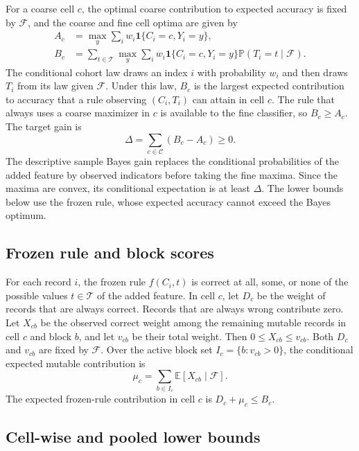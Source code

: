 \documentclass[preprint,11pt]{elsarticle}
\newcommand{\E}{\mathbb E}
\newcommand{\Prb}{\mathbb P}
\newcommand{\given}{\mathcal F}
\begin{document}
For a coarse cell $c$, the optimal coarse contribution to expected accuracy is fixed by $\given$, and the coarse and fine cell optima are given by
\begin{align}
 A_c &= \max_y \sum_i w_i\mathbf 1\{C_i=c,Y_i=y\},\\
 B_c &= \sum_{t\in\mathcal T}\max_y
 \sum_i w_i\mathbf 1\{C_i=c,Y_i=y\}\Prb(T_i=t\mid\given).
\end{align}
The conditional cohort law draws an index $i$ with probability $w_i$ and then draws $T_i$ from its law given $\given$. Under this law, $B_c$ is the largest expected contribution to accuracy that a rule observing $(C_i,T_i)$ can attain in cell $c$. The rule that always uses a coarse maximizer in $c$ is available to the fine classifier, so $B_c\ge A_c$. The target gain is
\begin{equation}
 \Delta=\sum_{c\in\mathcal C}(B_c-A_c)\ge 0.
 \label{eq:target}
\end{equation}
The descriptive sample Bayes gain replaces the conditional probabilities of the added feature by observed indicators before taking the fine maxima. Since the maxima are convex, its conditional expectation is at least $\Delta$. The lower bounds below use the frozen rule, whose expected accuracy cannot exceed the Bayes optimum.

\subsection{Frozen rule and block scores}
\label{sec:certificates}

For each record $i$, the frozen rule $f(C_i,t)$ is correct at all, some, or none of the possible values $t\in\mathcal T$ of the added feature. In cell $c$, let $D_c$ be the weight of records that are always correct. Records that are always wrong contribute zero. Let $X_{cb}$ be the observed correct weight among the remaining mutable records in cell $c$ and block $b$, and let $v_{cb}$ be their total weight. Then $0\le X_{cb}\le v_{cb}$. Both $D_c$ and $v_{cb}$ are fixed by $\given$. Over the active block set $I_c=\{b:v_{cb}>0\}$, the conditional expected mutable contribution is
\[
 \mu_c=\sum_{b\in I_c}\E[X_{cb}\mid\given].
\]
The expected frozen-rule contribution in cell $c$ is $D_c+\mu_c\le B_c$.

\subsection{Cell-wise and pooled lower bounds}
\end{document}
